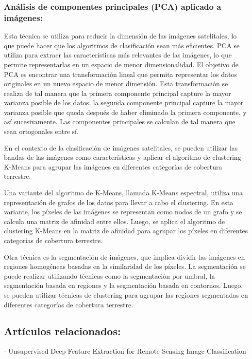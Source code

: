 \documentclass[article]{llncs}
\begin{document}
\subsubsection{Análisis de componentes principales (PCA) aplicado a imágenes:} Esta técnica se utiliza para reducir la dimensión de 
las imágenes satelitales, lo que puede hacer que los algoritmos de clasificación sean más eficientes. PCA se utiliza para 
extraer las características más relevantes de las imágenes, lo que permite representarlas en un espacio de menor 
dimensionalidad. El objetivo de PCA es encontrar una transformación lineal que permita representar los datos originales 
en un nuevo espacio de menor dimensión. Esta transformación se realiza de tal manera que la primera componente principal 
capture la mayor varianza posible de los datos, la segunda componente principal capture la mayor varianza posible que 
queda después de haber eliminado la primera componente, y así sucesivamente. Las componentes principales se calculan de 
tal manera que sean ortogonales entre sí.

En el contexto de la clasificación de imágenes satelitales, se pueden utilizar las bandas de las imágenes como 
características y aplicar el algoritmo de clustering K-Means para agrupar las imágenes en diferentes categorías de 
cobertura terrestre.

Una variante del algoritmo de K-Means, llamada K-Means espectral, utiliza una representación de grafos de los datos para 
llevar a cabo el clustering. En esta variante, los píxeles de las imágenes se representan como nodos de un grafo y se 
calcula una matriz de afinidad entre ellos. Luego, se aplica el algoritmo de clustering K-Means en la matriz de afinidad 
para agrupar los píxeles en diferentes categorías de cobertura terrestre.

Otra técnica es la segmentación de imágenes, que implica dividir las imágenes en regiones homogéneas basadas en la 
similaridad de los píxeles. La segmentación se puede realizar utilizando técnicas como la segmentación por umbral, la 
segmentación basada en regiones y la segmentación basada en contornos. Luego, se pueden utilizar técnicas de clustering 
para agrupar las regiones segmentadas en diferentes categorías de cobertura terrestre.

\subsection{Artículos relacionados:} 

- Unsupervised Deep Feature Extraction
  for Remote Sensing Image Classification
\end{document}
